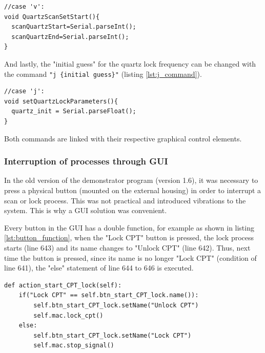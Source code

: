 \documentclass[a4paper,12pt]{article}
\begin{document}
\begin{lstlisting}[style=c++,label={lst:v_command},caption={Command to change the quartz's scan parameters (file: mac.ino).},firstnumber=476]
//case 'v':
void QuartzScanSetStart(){
  scanQuartzStart=Serial.parseInt();
  scanQuartzEnd=Serial.parseInt();  
}
\end{lstlisting}

And lastly, the "initial guess" for the quartz lock frequency can be changed with the command \mbox{\texttt{"j \{initial guess\}"}} (listing \ref{lst:j_command}).

\begin{lstlisting}[style=c++,label={lst:j_command},caption={Command to change the quartz's lock "initial guess" frequency (file: mac.ino).},firstnumber=462]
//case 'j':
void setQuartzLockParameters(){
  quartz_init = Serial.parseFloat();
}
\end{lstlisting}

Both commands are linked with their respective graphical control elements.

\subsubsection{Interruption of processes through GUI}
\label{section:stop_process}

In the old version of the demonstrator program (version 1.6), it was necessary to press a physical button (mounted on the external housing) in order to interrupt a scan or lock process. This was not practical and introduced vibrations to the system. This is why a GUI solution was convenient.

Every button in the GUI has a double function, for example as shown in listing \ref{lst:button_function}, when the "Lock CPT" button is pressed, the lock process starts (line 643) and its name changes to "Unlock CPT" (line 642). Thus, next time the button is pressed, since its name is no longer "Lock CPT" (condition of line 641), the "else" statement of line 644 to 646 is executed.

\begin{lstlisting}[style=python,label={lst:button_function},caption={Double function for GUI buttons (file: qt\_mac.py).},firstnumber=640]
def action_start_CPT_lock(self):
    if("Lock CPT" == self.btn_start_CPT_lock.name()):
        self.btn_start_CPT_lock.setName("Unlock CPT")
        self.mac.lock_cpt()
    else:
        self.btn_start_CPT_lock.setName("Lock CPT")
        self.mac.stop_signal()
\end{lstlisting}
\end{document}

